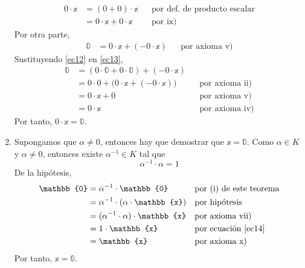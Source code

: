 \begin{theorem}
\begin{enumerate}[label=\roman*.]
\begin{align}
            0 \cdot \mathbb{x} & = (0 + 0) \cdot \mathbb{x} && \text{por def. de producto escalar} \label{ec11} \\
            & = 0 \cdot \mathbb{x} + 0 \cdot \mathbb{x} && \text{por ix)} \label{ec12}
        \end{align}
        Por otra parte,
        \begin{align}
            \mathbb{0} & = 0 \cdot \mathbb{x} + (-0 \cdot \mathbb{x}) && \text{por axioma v)} \label{ec13}
        \end{align}
        Sustituyendo \eqref{ec12} en \eqref{ec13},
        \begin{align*}
            \mathbb{0} & = (0 \cdot \mathbb{0} + 0 \cdot \mathbb{0}) + (-0 \cdot \mathbb{x}) \\
            & = 0 \cdot 0 + \big( 0 \cdot \mathbb{x} + (-0 \cdot \mathbb{x}) \big) && \text{por axioma ii)} \\
            & = 0 \cdot \mathbb{x} + 0 && \text{por axioma v)} \\
            & = 0 \cdot \mathbb{x} && \text{por axioma iv)}
        \end{align*}
        Por tanto, $0 \cdot \mathbb{x} = \mathbb{0}$.
        \item Supongamos que $\alpha \neq 0$, entonces hay que demostrar que $\mathbb{x} = \mathbb{0}$. Como $\alpha \in K$ y $\alpha \neq 0$, entonces existe $\alpha^{-1} \in K$ tal que
        \begin{equation}
            \alpha^{-1} \cdot \alpha = 1 \label{ec14}
        \end{equation}
        De la hipótesis,
        \begin{align*}
            \mathbb{0} & = \alpha^{-1} \cdot \mathbb{0} && \text{por (i) de este teorema} \\
            & = \alpha^{-1} \cdot (\alpha \cdot \mathbb{x}) && \text{por hipótesis} \\
            & = (\alpha^{-1} \cdot \alpha) \cdot \mathbb{x} && \text{por axioma vii)} \\
            & = 1 \cdot \mathbb{x} && \text{por ecuación \eqref{ec14}} \\
            & = \mathbb{x} && \text{por axioma x)}
        \end{align*}
        Por tanto, $\mathbb{x} = \mathbb{0}$.
        

\end{enumerate}
\end{theorem}
